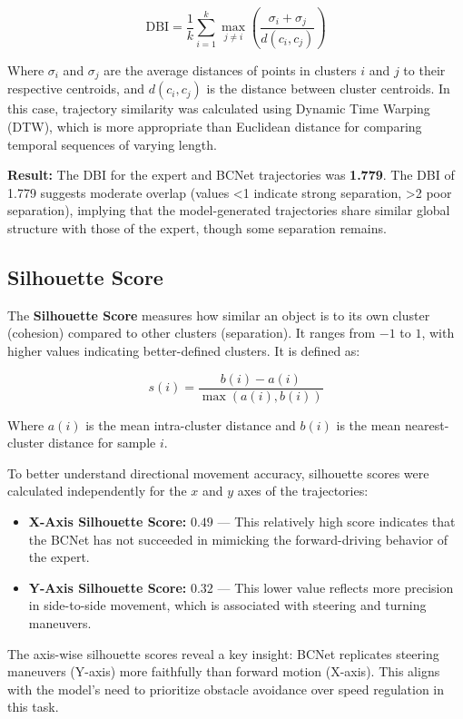 \[
  \text{DBI} = \frac{1}{k} \sum_{i=1}^{k} \max_{j \ne i} \left( \frac{\sigma_i + \sigma_j}{d(c_i, c_j)} \right)
\]

Where $\sigma_i$ and $\sigma_j$ are the average distances of points in clusters $i$ and $j$ to their respective centroids, and $d(c_i, c_j)$ is the distance between cluster centroids. In this case, trajectory similarity was calculated using Dynamic Time Warping (DTW), which is more appropriate than Euclidean distance for comparing temporal sequences of varying length.

\textbf{Result:} The DBI for the expert and BCNet trajectories was \textbf{1.779}. The DBI of 1.779 suggests moderate overlap (values <1 indicate strong separation, >2 poor separation), implying that the model-generated trajectories share similar global structure with those of the expert, though some separation remains.

\subsection{Silhouette Score}

The \textbf{Silhouette Score} \autocite{kaufman2009finding} measures how similar an object is to its own cluster (cohesion) compared to other clusters (separation). It ranges from $-1$ to $1$, with higher values indicating better-defined clusters. It is defined as:

\[
  s(i) = \frac{b(i) - a(i)}{\max(a(i), b(i))}
\]

Where $a(i)$ is the mean intra-cluster distance and $b(i)$ is the mean nearest-cluster distance for sample $i$.

To better understand directional movement accuracy, silhouette scores were calculated independently for the $x$ and $y$ axes of the trajectories:

\begin{itemize}
  \item \textbf{X-Axis Silhouette Score:} $0.49$ — This relatively high score indicates that the BCNet has not succeeded in mimicking the forward-driving behavior of the expert.
  \item \textbf{Y-Axis Silhouette Score:} $0.32$ — This lower value reflects more precision in side-to-side movement, which is associated with steering and turning maneuvers.
\end{itemize}

The axis-wise silhouette scores reveal a key insight: BCNet replicates steering maneuvers (Y-axis) more faithfully than forward motion (X-axis). This aligns with the model's need to prioritize obstacle avoidance over speed regulation in this task.

